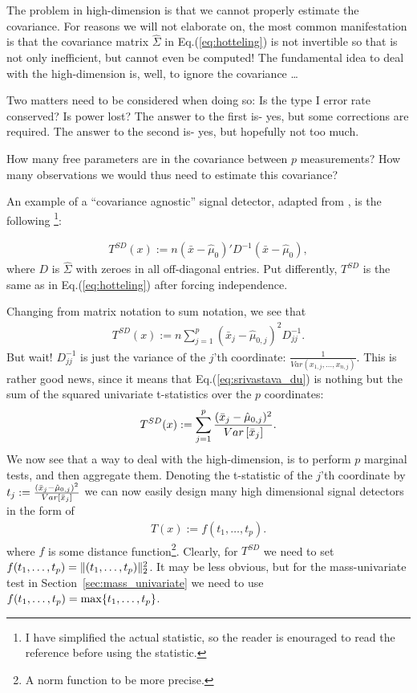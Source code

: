 The problem in high-dimension is that we cannot properly estimate the covariance. 
For reasons we will not elaborate on, the most common manifestation is that the covariance matrix $\hat{\Sigma}$ in Eq.(\ref{eq:hotteling}) is not invertible so that \tsq is not only inefficient, but cannot even be computed!
The fundamental idea to deal with the high-dimension is, well, to ignore the covariance \dots

Two matters need to be considered when doing so:
Is the type I error rate conserved?
Is power lost?
The answer to the first is- yes, but some corrections are required.
The answer to the second is- yes, but hopefully not too much.

\begin{think}
How many free parameters are in the covariance between $p$ measurements?
How many observations we would thus need to estimate this covariance?
\end{think} 



An example of a ``covariance agnostic'' signal detector, adapted from \cite{srivastava_test_2008}, is the following \footnote{I have simplified the actual statistic, so the reader is enouraged to read the reference before using the statistic.}:
\begin{definition}
\begin{align}
\label{eq:srivastava_du}
	 	T^{SD}(x) := n (\bar{x}-\hat{\mu}_0)' D^{-1} (\bar{x}-\hat{\mu}_0),
\end{align}
where $D$ is $\hat{\Sigma}$ with zeroes in all off-diagonal entries. Put differently, $T^{SD}$ is the same as \tsq in Eq.(\ref{eq:hotteling}) after forcing independence.
\end{definition}
Changing from matrix notation to sum notation, we see that 
\begin{align}
	 	T^{SD}(x) := n \sum_{j=1}^p (\bar{x}_j - \hat{\mu}_{0,j})^2 D^{-1}_{jj} .
\end{align}
But wait! 
$D^{-1}_{jj}$ is just the variance of the $j$'th coordinate: $\frac{1}{Var(x_{1,j},\dots,x_{n,j})}$.
This is rather good news, since it means that Eq.(\ref{eq:srivastava_du}) is nothing but the sum of the squared univariate t-statistics over the $p$ coordinates:
\begin{align}
	 	T^{SD}(x) :=  \sum_{j=1}^p \frac{(\bar{x}_j - \hat{\mu}_{0,j})^2}{\mathop{Var} \left[ \bar{x}_j \right]}  .
\end{align}
We now see that a way to deal with the high-dimension, is to perform $p$ marginal tests, and then aggregate them.
Denoting the t-statistic of the $j$'th coordinate by $t_j:= \frac{(\bar{x}_j - \hat{\mu}_{0,j})^2}{\mathop{Var} \left[ \bar{x}_j \right]}$ we can now easily design many high dimensional signal detectors in the form of
\begin{align}
	 	T(x) :=  f(t_1,\dots,t_p) .
\end{align}
where $f$ is some distance function\footnote{A norm function to be more precise.}.
Clearly, for $T^{SD}$ we need to set $f(t_1,\dots,t_p) = \Vert (t_1,\dots,t_p) \Vert_2^2$.
It may be less obvious, but for the mass-univariate test in Section~\ref{sec:mass_univariate} we need to use $f(t_1,\dots,t_p)=\max\{ t_1,\dots,t_p \}$.




